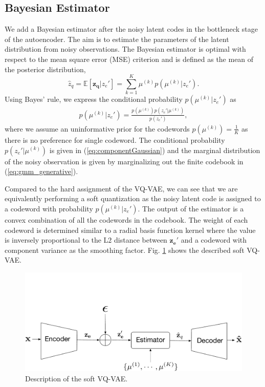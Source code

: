 \documentclass[letterpaper]{article} %
\begin{document}
\subsection{Bayesian Estimator}
We add a Bayesian estimator after the noisy latent codes in the bottleneck stage of the autoencoder. The aim is to estimate the parameters of the latent distribution from noisy observations.
The Bayesian estimator is optimal with respect to the mean square error (MSE)  criterion and is defined as the mean of the posterior distribution,
\begin{equation}
\label{eq: estimator}
\hat{z}_q = \mathbb{E}[\mathbf{z_q}|z_e'] = \sum_{k = 1}^{K}\mu^{(k)}p\left(\mu^{(k)}|z_e'\right).
\end{equation}
Using Bayes' rule, we express the conditional probability $p\left(\mu^{(k)}|z_e'\right)$  as
\begin{align}
p\left(\mu^{(k)}|z_e'\right) = \frac{p\left(\mu^{(k)}\right)p\left(z_e'|\mu^{(k)}\right)}{p(z_e')},
\end{align}
where we assume an uninformative prior for the codewords $p\left(\mu^{(k)}\right) = \frac{1}{K}$ as there is no preference for single codeword. The conditional probability $p\left(z_e'|\mu^{(k)}\right)$ is given in (\ref{eq:componentGaussian}) and the marginal distribution of the noisy observation is given by marginalizing out the finite codebook in (\ref{eq:gmm_generative}).

Compared to the hard assignment of the VQ-VAE, we can see that we are equivalently performing a soft quantization as the noisy latent code is assigned to a codeword with probability $p\left(\mu^{(k)}|z_e'\right)$. The output of the estimator is a convex combination of all the codewords in the codebook. The weight of each codeword is determined similar to a radial basis function kernel where the value is inversely proportional to the L$2$ distance between $\mathbf{z_e'}$ and a codeword with component variance as the smoothing factor.
Fig. \ref{fig:estimator} shows the described soft VQ-VAE.
\begin{figure}[!ht]
\centering
\includegraphics[width=.45\textwidth]{estimatorVQVAE.pdf}
\caption{Description of the soft VQ-VAE.}
\label{fig:estimator}
\end{figure}
\end{document}
